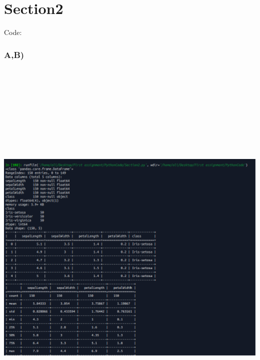 \documentclass[12pt]{article}
\begin{document}
\section{Section2}
Code:\\

\subsubsection{A,B)}
\includegraphics[width=15cm, height=20cm]{ss5}
\end{document}
